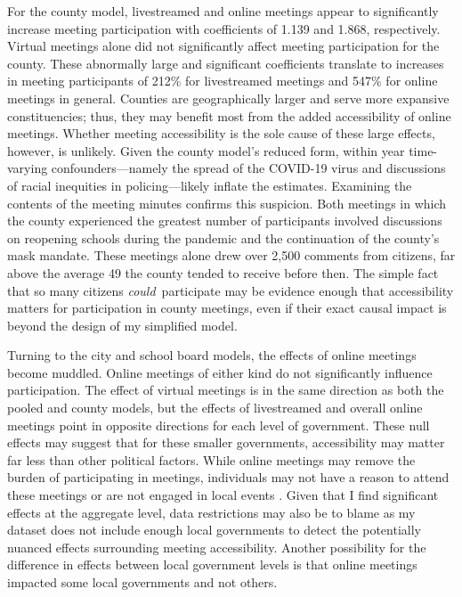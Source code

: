     For the county model, livestreamed and online meetings appear to significantly increase meeting participation with coefficients of 1.139 and 1.868, respectively. Virtual meetings alone did not significantly affect meeting participation for the county. These abnormally large and significant coefficients translate to increases in meeting participants of 212\% for livestreamed meetings and 547\% for online meetings in general. Counties are geographically larger and serve more expansive constituencies; thus, they may benefit most from the added accessibility of online meetings.  Whether meeting accessibility is the sole cause of these large effects, however, is unlikely. Given the county model’s reduced form, within year time-varying confounders—namely the spread of the COVID-19 virus and discussions of racial inequities in policing—likely inflate the estimates. Examining the contents of the meeting minutes confirms this suspicion. Both meetings in which the county experienced the greatest number of participants involved discussions on reopening schools during the pandemic and the continuation of the county’s mask mandate. These meetings alone drew over 2,500 comments from citizens, far above the average 49 the county tended to receive before then. The simple fact that so many citizens \emph{could} participate may be evidence enough that accessibility matters for participation in county meetings, even if their exact causal impact is beyond the design of my simplified model.

    Turning to the city and school board models, the effects of online meetings become muddled. Online meetings of either kind do not significantly influence participation. The effect of virtual meetings is in the same direction as both the pooled and county models, but the effects of livestreamed and overall online meetings point in opposite directions for each level of government. These null effects may suggest that for these smaller governments, accessibility may matter far less than other political factors. While online meetings may remove the burden of participating in meetings, individuals may not have a reason to attend these meetings or are not engaged in local events \citep{hopkinsIncreasinglyUnitedStates2018}. Given that I find significant effects at the aggregate level, data restrictions may also be to blame as my dataset does not include enough local governments to detect the potentially nuanced effects surrounding meeting accessibility. Another possibility for the difference in effects between local government levels is that online meetings impacted some local governments and not others.

